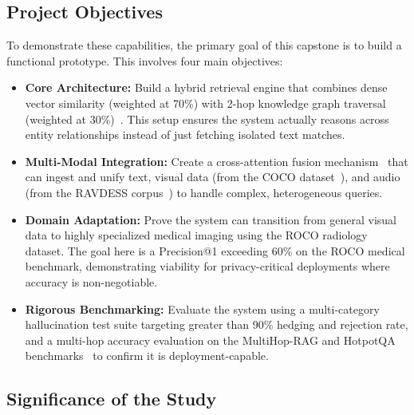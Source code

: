 \documentclass[12pt, a4paper]{article}
\begin{document}
\subsection{Project Objectives}

To demonstrate these capabilities, the primary goal of this capstone is to
build a functional prototype. This involves four main objectives:

\begin{itemize}[leftmargin=1.5em]
  \item \textbf{Core Architecture:} Build a hybrid retrieval engine that
    combines dense vector similarity (weighted at 70\%) with 2-hop knowledge
    graph traversal (weighted at 30\%)~\cite{sarmah2024hybridrag}. This setup
    ensures the system actually reasons across entity relationships instead of
    just fetching isolated text matches.

  \item \textbf{Multi-Modal Integration:} Create a cross-attention fusion
    mechanism~\cite{kadam2022multimodal} that can ingest and unify text, visual
    data (from the COCO dataset~\cite{lin2014microsoft}), and audio (from the
    RAVDESS corpus~\cite{livingstone2018ryerson}) to handle complex,
    heterogeneous queries.

  \item \textbf{Domain Adaptation:} Prove the system can transition from
    general visual data to highly specialized medical imaging using the ROCO
    radiology dataset. The goal here is a Precision@1 exceeding 60\% on the
    ROCO medical benchmark, demonstrating viability for privacy-critical
    deployments where accuracy is non-negotiable.

  \item \textbf{Rigorous Benchmarking:} Evaluate the system using a
    multi-category hallucination test suite targeting greater than 90\%
    hedging and rejection rate, and a multi-hop accuracy evaluation on the
    MultiHop-RAG and HotpotQA
    benchmarks~\cite{sarmah2024hybridrag,tang2024multihop} to confirm it is
    deployment-capable.
\end{itemize}

\subsection{Significance of the Study}
\end{document}
